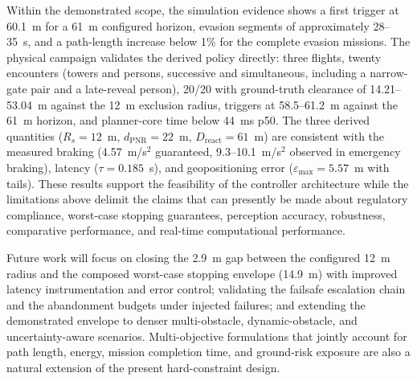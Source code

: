 \documentclass[electronics,article,submit,moreauthors]{Definitions/mdpi}
\DeclareRobustCommand{\added}[1]{#1}%
\DeclareRobustCommand{\added}[1]{\textcolor{green!50!black}{#1}}
\def\added#1{#1}%
\begin{document}
\added{Within the demonstrated scope, the simulation evidence shows a first trigger at 60.1~m for a 61~m configured horizon, evasion segments of approximately 28--35~s, and a path-length increase below 1\% for the complete evasion missions. The physical campaign validates the derived policy directly: three flights, twenty encounters (towers and persons, successive and simultaneous, including a narrow-gate pair and a late-reveal person), 20/20 with ground-truth clearance of 14.21--53.04~m against the 12~m exclusion radius, triggers at 58.5--61.2~m against the 61~m horizon, and planner-core time below 44~ms p50. The three derived quantities ($R_s = 12$~m, $d_{\mathrm{PNR}} = 22$~m, $D_{\mathrm{react}} = 61$~m) are consistent with the measured braking (4.57~m/s$^2$ guaranteed, 9.3--10.1~m/s$^2$ observed in emergency braking), latency ($\tau = 0.185$~s), and geopositioning error ($\varepsilon_{\max} = 5.57$~m with tails). These results support the feasibility of the controller architecture while the limitations above delimit the claims that can presently be made about regulatory compliance, worst-case stopping guarantees, perception accuracy, robustness, comparative performance, and real-time computational performance.}


\added{Future work will focus on closing the 2.9~m gap between the configured 12~m radius and the composed worst-case stopping envelope (14.9~m) with improved latency instrumentation and error control; validating the failsafe escalation chain and the abandonment budgets under injected failures; and extending the demonstrated envelope to denser multi-obstacle, dynamic-obstacle, and uncertainty-aware scenarios. Multi-objective formulations that jointly account for path length, energy, mission completion time, and ground-risk exposure are also a natural extension of the present hard-constraint design.}



\vspace{6pt}


\end{document}
